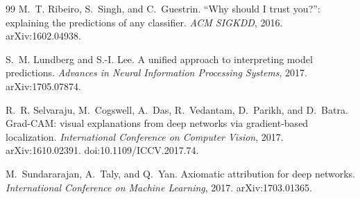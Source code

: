 \documentclass[11pt]{article}
\begin{document}
\begin{thebibliography}{99}
M.~T. Ribeiro, S.~Singh, and C.~Guestrin.
\newblock ``Why should I trust you?'': explaining the predictions of any
  classifier.
\newblock \emph{ACM SIGKDD}, 2016.
\newblock arXiv:1602.04938.

S.~M. Lundberg and S.-I. Lee.
\newblock A unified approach to interpreting model predictions.
\newblock \emph{Advances in Neural Information Processing Systems}, 2017.
\newblock arXiv:1705.07874.

R.~R. Selvaraju, M.~Cogswell, A.~Das, R.~Vedantam, D.~Parikh, and D.~Batra.
\newblock Grad-CAM: visual explanations from deep networks via gradient-based
  localization.
\newblock \emph{International Conference on Computer Vision}, 2017.
\newblock arXiv:1610.02391. doi:10.1109/ICCV.2017.74.

M.~Sundararajan, A.~Taly, and Q.~Yan.
\newblock Axiomatic attribution for deep networks.
\newblock \emph{International Conference on Machine Learning}, 2017.
\newblock arXiv:1703.01365.

\end{thebibliography}
\end{document}
